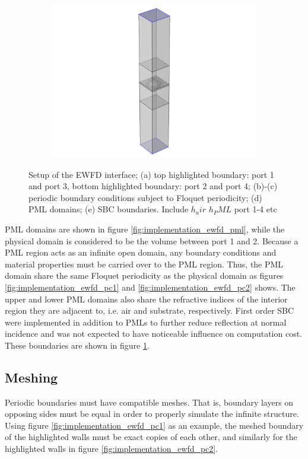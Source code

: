 \begin{figure}[htb]
\begin{subfigure}{0.19\textwidth}
        \includegraphics[width=\linewidth, trim=4.2cm 0 4.2cm 0cm, clip]{figures/ch4/implem/ewfd/ewfd_sbc.png}
        \caption{}
        \label{fig:implementation_ewfd_sbc}
    \end{subfigure}
    \caption{Setup of the EWFD interface; (a) top highlighted boundary: port 1 and port 3, bottom highlighted boundary: port 2 and port 4; (b)-(c) periodic boundary conditions subject to Floquet periodicity; (d) PML domains; (e) SBC boundaries. \color{red}Include $h_air$ $h_PML$ port 1-4 etc}
    \label{fig:implementation_ewfd_setup}
\end{figure}

PML domains are shown in figure \ref{fig:implementation_ewfd_pml}, while the physical domain is considered to be the volume between port 1 and 2. Because a PML region acts as an infinite open domain, any boundary conditions and material properties must be carried over to the PML region. Thus, the PML domain share the same Floquet periodicity as the physical domain as figures \ref{fig:implementation_ewfd_pc1} and \ref{fig:implementation_ewfd_pc2} shows. The upper and lower PML domains also share the refractive indices of the interior region they are adjacent to, i.e. air and substrate, respectively. First order SBC were implemented in addition to PMLs to further reduce reflection at normal incidence and was not expected to have noticeable influence on computation cost. These boundaries are shown in figure \ref{fig:implementation_ewfd_sbc}.

\subsection{Meshing}
Periodic boundaries must have compatible meshes. That is, boundary layers on opposing sides must be equal in order to properly simulate the infinite structure. Using figure \ref{fig:implementation_ewfd_pc1} as an example, the meshed boundary of the highlighted walls must be exact copies of each other, and similarly for the highlighted walls in figure \ref{fig:implementation_ewfd_pc2}. 

